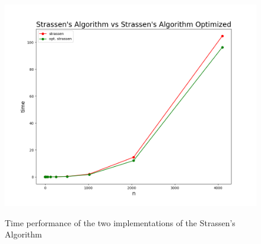 \documentclass{article}
\begin{document}
	\begin{figure}[h]
		\begin{center}
			\includegraphics[width=.8\textwidth]{../plot/plot_strassen.png}
			\label{plot}
			\caption{Time performance of the two implementations of the Strassen's Algorithm}
		\end{center}
	\end{figure}	
	
	
\end{document}
